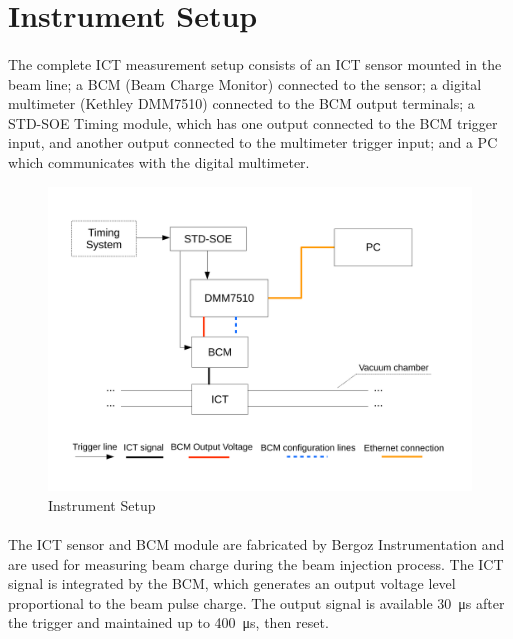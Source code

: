 \documentclass[openany]{article}
\begin{document}
\section{Instrument Setup}

	\paragraph{} The complete ICT measurement setup consists of an ICT sensor mounted in the beam line; a BCM (Beam Charge Monitor) connected to the sensor; a digital multimeter (Kethley DMM7510) connected to the BCM output terminals; a STD-SOE Timing module, which has one output connected to the BCM trigger input, and another output connected to the multimeter trigger input; and a PC which communicates with the digital multimeter.

	\begin{figure}[!h]
	\caption{Instrument Setup}
	\label{fig:ict-setup}
	\centering
	\includegraphics[width=1.0\textwidth]{ict-setup-image}
	\end{figure}
\FloatBarrier

	\paragraph{} The ICT sensor and BCM module are fabricated by Bergoz Instrumentation and are used for measuring beam charge during the beam injection process. The ICT signal is integrated by the BCM, which generates an output voltage level proportional to the beam pulse charge. The output signal is available \SI{30}{\micro\second} after the trigger and maintained up to \SI{400}{\micro\second}, then reset.
\end{document}
